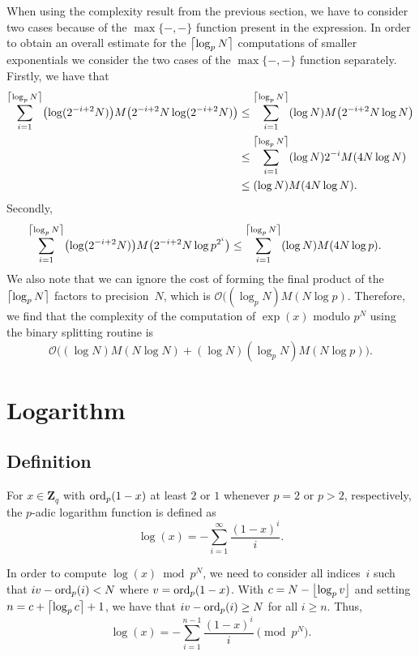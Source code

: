 When using the complexity result from the previous section, we 
have to consider two cases because of the $\max\{-,-\}$ function 
present in the expression.  In order to obtain an overall estimate 
for the $\left\lceil\log_p N\right\rceil$ computations of smaller exponentials 
we consider the two cases of the $\max\{-,-\}$ function separately.  
Firstly, we have that 
\begin{align*}
\sum_{i=1}^{\left\lceil\log_p N\right\rceil} \bigl( \log (2^{-i+2} N) \bigr) M \bigl( 2^{-i+2} N \log (2^{-i+2} N) \bigr) 
& \leq \sum_{i=1}^{\left\lceil\log_p N\right\rceil} (\log N) M\bigl(2^{-i+2} N \log N\bigr) \\
& \leq \sum_{i=1}^{\left\lceil\log_p N\right\rceil} (\log N) 2^{-i} M(4 N \log N) \\
& \leq (\log N) M(4 N \log N).
\end{align*}
Secondly, 
\begin{align*}
\sum_{i=1}^{\left\lceil\log_p N\right\rceil} \bigl( \log (2^{-i+2} N) \bigr) M \bigl( 2^{-i+2} N \log p^{2^i} \bigr) 
& \leq \sum_{i=1}^{\left\lceil\log_p N\right\rceil} (\log N) M(4 N \log p).
\end{align*}
We also note that we can ignore the cost of forming the final product 
of the $\left\lceil\log_p N\right\rceil$ factors to precision~$N$, which is 
$\mathcal{O}((\log_p N) M(N \log p)$.  Therefore, we find that the 
complexity of the computation of $\exp(x)$ modulo $p^N$ using the 
binary splitting routine is 
\begin{equation}
\mathcal{O}\bigl( (\log N) M(N \log N) 
    + (\log N) (\log_p N) M(N \log p) \bigr).
\end{equation}

\section{Logarithm}

\subsection{Definition}

For $x \in \mathbf{Z}_q$ with $\operatorname{ord}_p(1 - x)$ at least $2$ or $1$ 
whenever $p = 2$ or $p > 2$, respectively, the $p$-adic logarithm 
function is defined as 
\begin{equation}
\log(x) = - \sum_{i=1}^{\infty} \frac{(1-x)^i}{i}.
\end{equation}

In order to compute $\log(x) \bmod p^N$, we need to consider all 
indices~$i$ such that $i v - \operatorname{ord}_p(i) < N$ where $v = \operatorname{ord}_p(1-x)$.  
With $c = N - \left\lfloor\log_p v\right\rfloor$ and setting $n = c + \left\lceil\log_p c\right\rceil + 1$, 
we have that $i v - \operatorname{ord}_p(i) \geq N$ for all $i \geq n$.  Thus, 
\begin{equation*}
\log(x) = - \sum_{i=1}^{n-1} \frac{(1-x)^i}{i} \pmod{p^N}.
\end{equation*}

